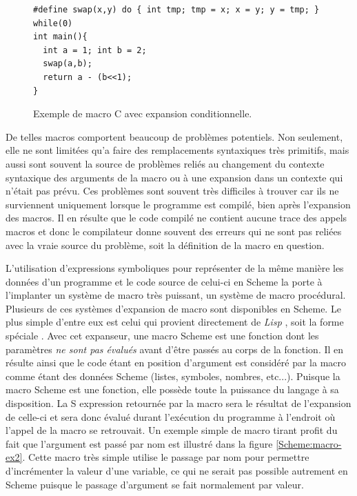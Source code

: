 \documentclass[12pt,oneside,letterpaper,francais]{book}
\newcommand{\lisp}{{\textit{Lisp }}}
\newcommand{\scheme}[1]{\selectlanguage{english}{\tt #1}\selectlanguage{french}}
\begin{document}
\begin{figure}[htb!]
  \begin{verbatim}
#define swap(x,y) do { int tmp; tmp = x; x = y; y = tmp; } while(0)
int main(){
  int a = 1; int b = 2;
  swap(a,b);
  return a - (b<<1);
}
  \end{verbatim}
  \caption{Exemple de macro C avec expansion conditionnelle.}
  \label{Scheme:c-macros}
\end{figure}

De telles macros comportent beaucoup de problèmes potentiels. Non
seulement, elle ne sont limitées qu'a faire des remplacements
syntaxiques très primitifs, mais aussi sont souvent la source de
problèmes reliés au changement du contexte syntaxique des arguments de
la macro ou à une expansion dans un contexte qui n'était pas
prévu. Ces problèmes sont souvent très difficiles à trouver car ils ne
surviennent uniquement lorsque le programme est compilé, bien après
l'expansion des macros. Il en résulte que le code compilé ne contient
aucune trace des appels macros et donc le compilateur donne souvent
des erreurs qui ne sont pas reliées avec la vraie source du problème,
soit la définition de la macro en question.

L'utilisation d'expressions symboliques pour représenter de la même
manière les données d'un programme et le code source de celui-ci en
Scheme la porte à l'implanter un système de macro très puissant, un
système de macro procédural. Plusieurs de ces systèmes d'expansion de
macro sont disponibles en Scheme. Le plus simple d'entre eux est celui
qui provient directement de \lisp, soit la forme spéciale
\scheme{define-macro}. Avec cet expanseur, une macro Scheme est une
fonction dont les paramètres \emph{ne sont pas évalués} avant d'être
passés au corps de la fonction. Il en résulte ainsi que le code étant
en position d'argument est considéré par la macro comme étant des
données Scheme (listes, symboles, nombres, etc...). Puisque la macro
Scheme est une fonction, elle possède toute la puissance du langage à
sa disposition. La S expression retournée par la macro sera le
résultat de l'expansion de celle-ci et sera donc évalué durant
l'exécution du programme à l'endroit où l'appel de la macro se
retrouvait. Un exemple simple de macro tirant profit du fait que
l'argument est passé par nom est illustré dans la figure
\ref{Scheme:macro-ex2}. Cette macro très simple utilise le passage par
nom pour permettre d'incrémenter la valeur d'une variable, ce qui ne
serait pas possible autrement en Scheme puisque le passage d'argument
se fait normalement par valeur.
\end{document}
